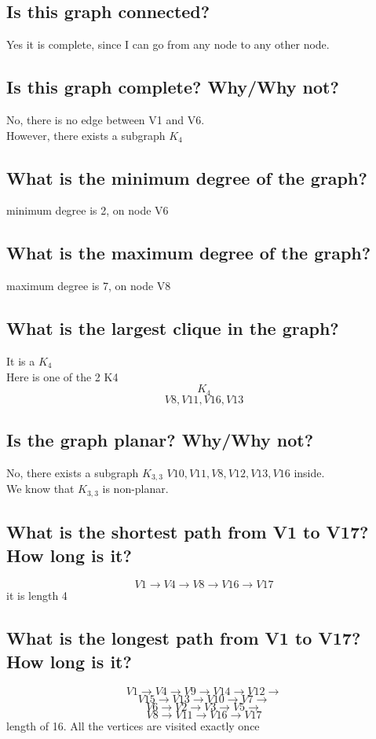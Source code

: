 \documentclass[a4paper,12pt]{article}
\begin{document}
\subsection{Is this graph connected?}
Yes it is complete, since I can go from any node to any other node.
\subsection{Is this graph complete?  Why/Why not?}
No, there is no edge between V1 and V6.\\
However, there exists a subgraph $K_{4}$
\subsection{What is the minimum degree of the graph?}
minimum degree is 2, on node V6
\subsection{What is the maximum degree of the graph?}
maximum degree is 7, on node V8
\subsection{What is the largest clique in the graph?}
It is a $K_{4}$\\
Here is one of the 2 K4
\[K_{4}\] \[V8,V11,V16,V13\]

\subsection{Is the graph planar? Why/Why not?}
No, there exists a subgraph $K_{3,3}$ $V10,V11,V8,V12,V13,V16$ inside.\\
We know that $K_{3,3}$ is non-planar.\\
\subsection{What is the shortest path from V1 to V17? How long is it?}

\[V1\rightarrow V4\rightarrow V8\rightarrow V16\rightarrow V17\]
it is length 4
\subsection{What is the longest path from V1 to V17?  How long is it?}
\[V1\rightarrow V4 \rightarrow V9 \rightarrow V14 \rightarrow V12 \rightarrow\]
\[V15 \rightarrow V13 \rightarrow V10 \rightarrow V7 \rightarrow\]
\[V6 \rightarrow V2\rightarrow V3\rightarrow V5 \rightarrow\]
\[V8 \rightarrow V11\rightarrow V16\rightarrow V17 \]
length of 16. All the vertices are visited exactly once
\end{document}
